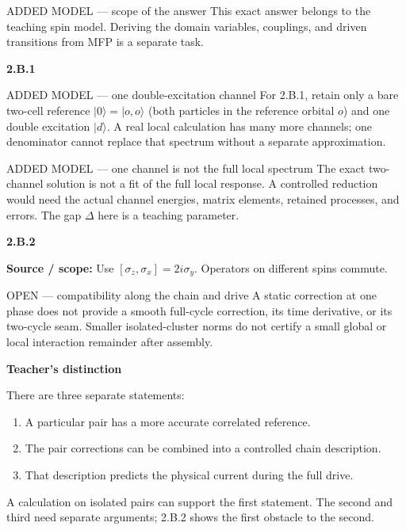 \documentclass[11pt,a4paper]{article}
\newcommand{\ket}[1]{\lvert #1\rangle}
\newcommand{\smallheading}[1]{\par\Needspace{6\baselineskip}\medskip\textbf{#1}\par}
\begin{document}
\begin{redbox}{ADDED MODEL --- scope of the answer}
This exact answer belongs to the teaching spin model. Deriving the domain variables, couplings, and driven transitions from MFP is a separate task.
\end{redbox}
\par\medskip\textbf{2.B.1}\par
\begin{redbox}{ADDED MODEL --- one double-excitation channel}
For 2.B.1, retain only a bare two-cell reference $\ket{0}=\ket{o,o}$ (both particles in the reference orbital $o$) and one double excitation $\ket d$. A real local calculation has many more channels; one denominator cannot replace that spectrum without a separate approximation.
\end{redbox}
\begin{redbox}{ADDED MODEL --- one channel is not the full local spectrum}
The exact two-channel solution is not a fit of the full local response. A controlled reduction would need the actual channel energies, matrix elements, retained processes, and errors. The gap $\Delta$ here is a teaching parameter.
\end{redbox}
\par\medskip\textbf{2.B.2}\par
{\footnotesize\textbf{Source / scope:} Use $[\sigma_z,\sigma_x]=2i\sigma_y$. Operators on different spins commute.}\par
\begin{redbox}{OPEN --- compatibility along the chain and drive}
A static correction at one phase does not provide a smooth full-cycle correction, its time derivative, or its two-cycle seam. Smaller isolated-cluster norms do not certify a small global or local interaction remainder after assembly.
\end{redbox}
\smallheading{Teacher's distinction}
There are three separate statements:
\begin{enumerate}[leftmargin=7mm,itemsep=5pt]
\item A particular pair has a more accurate correlated reference.
\item The pair corrections can be combined into a controlled chain description.
\item That description predicts the physical current during the full drive.
\end{enumerate}
A calculation on isolated pairs can support the first statement. The second and third need separate arguments; 2.B.2 shows the first obstacle to the second.
\end{document}
